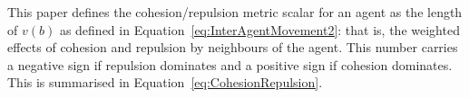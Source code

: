 \documentclass{ieeeaccess}
\begin{document}



This paper defines the cohesion/repulsion metric scalar for an agent as the length of $v(b)$  as defined in Equation~\ref{eq:InterAgentMovement2}: that is, the weighted effects of cohesion and repulsion by neighbours of the agent. This number carries a negative sign if repulsion dominates and a positive sign if cohesion dominates. This is summarised in Equation~\ref{eq:CohesionRepulsion}.
\end{document}
